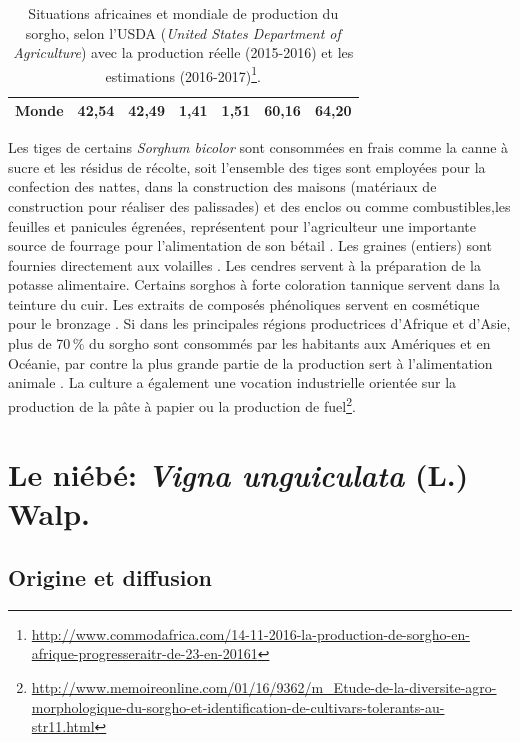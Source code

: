 \documentclass[a4paper,11pt]{article}
\begin{document}
\begin{table}
\begin{footnotesize}
\begin{center}
\begin{tabular}{ld{2.3}d{2.3}d{2.3}d{2.3}d{2.3}d{2.3}}
        \textbf{Monde} & 42,54  & 42,49 & 1,41 & 1,51 & 60,16 & 64,20 \\ \hline
      \end{tabular}
      \caption{Situations africaines et mondiale de production du
        sorgho, selon l'USDA (\emph{United States Department of
          Agriculture}) avec la production réelle (2015-2016) et les
        estimations
        (2016-2017)\protect\footnote{\protect\url{http://www.commodafrica.com/14-11-2016-la-production-de-sorgho-en-afrique-progresseraitr-de-23-en-20161}}.}
      \label{tab:USDA_global_sorgho_production}
    \end{center}
  \end{footnotesize}
\end{table}

Les tiges de certains \emph{Sorghum bicolor} sont consommées en frais
comme la canne à sucre et les résidus de récolte, soit l'ensemble des
tiges sont employées pour la confection des nattes, dans la
construction des maisons (matériaux de construction pour réaliser des
palissades) et des enclos ou comme combustibles,les feuilles et
panicules égrenées, représentent pour l'agriculteur une importante
source de fourrage pour l'alimentation de son bétail
\cite{Chantereau_1991}. Les graines (entiers) sont fournies
directement aux volailles \cite{SaintClair_1989}. Les cendres servent
à la préparation de la potasse alimentaire. Certains sorghos à forte
coloration tannique servent dans la teinture du cuir. Les extraits de
composés phénoliques servent en cosmétique pour le bronzage
\cite{BARRO_KONDOMBO_2010}. Si dans les principales régions
productrices d'Afrique et d'Asie, plus de 70\,\% du sorgho sont
consommés par les habitants aux Amériques et en Océanie, par contre la
plus grande partie de la production sert à l'alimentation animale
\cite{BARRO_KONDOMBO_2010}. La culture a également une vocation
industrielle orientée sur la production de la pâte à papier ou la
production de
fuel\footnote{\url{http://www.memoireonline.com/01/16/9362/m_Etude-de-la-diversite-agro-morphologique-du-sorgho-et-identification-de-cultivars-tolerants-au-str11.html}}.


\section{Le niébé: \emph{Vigna unguiculata} (L.) Walp.}

\subsection{Origine et diffusion}
\end{document}
